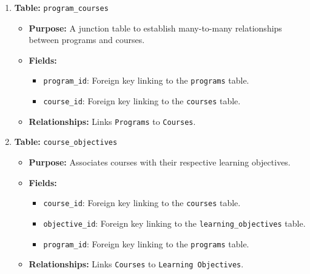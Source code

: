 \documentclass{article}
\begin{document}
\begin{enumerate}
		    \item \textbf{Table:} \texttt{program\_courses}
		    \begin{itemize}
		        \item \textbf{Purpose:} A junction table to establish many-to-many relationships between programs and courses.
		        \item \textbf{Fields:}
		        \begin{itemize}
		            \item \texttt{program\_id}: Foreign key linking to the \texttt{programs} table.
		            \item \texttt{course\_id}: Foreign key linking to the \texttt{courses} table.
		        \end{itemize}
		        \item \textbf{Relationships:} Links \texttt{Programs} to \texttt{Courses}.
		    \end{itemize}

		    \item \textbf{Table:} \texttt{course\_objectives}
		    \begin{itemize}
		        \item \textbf{Purpose:} Associates courses with their respective learning objectives.
		        \item \textbf{Fields:}
		        \begin{itemize}
		            \item \texttt{course\_id}: Foreign key linking to the \texttt{courses} table.
		            \item \texttt{objective\_id}: Foreign key linking to the \texttt{learning\_objectives} table.
		            \item \texttt{program\_id}: Foreign key linking to the \texttt{programs} table.
		        \end{itemize}
		        \item \textbf{Relationships:} Links \texttt{Courses} to \texttt{Learning Objectives}.
		    \end{itemize}


\end{enumerate}
\end{document}
